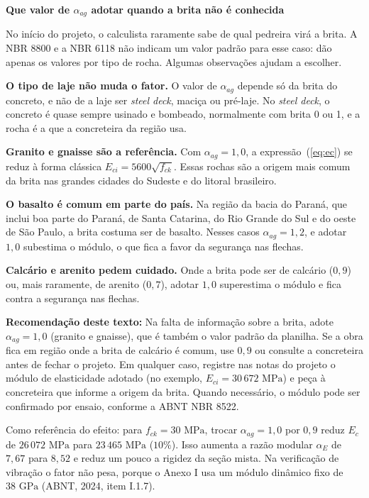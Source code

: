 \documentclass[11pt,a4paper]{article}
\newcommand{\caixaconceito}[2]{%
  \par\vspace{6pt}\noindent\colorbox{calloutbg}{%
    \parbox{\dimexpr\linewidth-2\fboxsep\relax}{%
      \vspace{4pt}\textbf{\color{primary}#1}\par\vspace{3pt}#2\vspace{4pt}%
    }%
  }\par\vspace{6pt}%
}
\begin{document}
\caixaconceito{Que valor de $\alpha_{ag}$ adotar quando a brita não é conhecida}{%
No início do projeto, o calculista raramente sabe de qual pedreira virá a brita. A NBR 8800 e a NBR 6118 não indicam um valor padrão para esse caso: dão apenas os valores por tipo de rocha. Algumas observações ajudam a escolher.\par\vspace{4pt}
\textbf{O tipo de laje não muda o fator.} O valor de $\alpha_{ag}$ depende só da brita do concreto, e não de a laje ser \textit{steel deck}, maciça ou pré-laje. No \textit{steel deck}, o concreto é quase sempre usinado e bombeado, normalmente com brita 0 ou 1, e a rocha é a que a concreteira da região usa.\par\vspace{4pt}
\textbf{Granito e gnaisse são a referência.} Com $\alpha_{ag} = 1{,}0$, a expressão~(\ref{eq:ec}) se reduz à forma clássica $E_{ci} = 5600\sqrt{f_{ck}}$. Essas rochas são a origem mais comum da brita nas grandes cidades do Sudeste e do litoral brasileiro.\par\vspace{4pt}
\textbf{O basalto é comum em parte do país.} Na região da bacia do Paraná, que inclui boa parte do Paraná, de Santa Catarina, do Rio Grande do Sul e do oeste de São Paulo, a brita costuma ser de basalto. Nesses casos $\alpha_{ag} = 1{,}2$, e adotar $1{,}0$ subestima o módulo, o que fica a favor da segurança nas flechas.\par\vspace{4pt}
\textbf{Calcário e arenito pedem cuidado.} Onde a brita pode ser de calcário ($0{,}9$) ou, mais raramente, de arenito ($0{,}7$), adotar $1{,}0$ superestima o módulo e fica contra a segurança nas flechas.\par\vspace{4pt}
\textbf{Recomendação deste texto:} Na falta de informação sobre a brita, adote $\alpha_{ag} = 1{,}0$ (granito e gnaisse), que é também o valor padrão da planilha. Se a obra fica em região onde a brita de calcário é comum, use $0{,}9$ ou consulte a concreteira antes de fechar o projeto. Em qualquer caso, registre nas notas do projeto o módulo de elasticidade adotado (no exemplo, $E_{ci} = 30\,672\text{ MPa}$) e peça à concreteira que informe a origem da brita. Quando necessário, o módulo pode ser confirmado por ensaio, conforme a ABNT NBR 8522.}

Como referência do efeito: para $f_{ck} = 30\text{ MPa}$, trocar $\alpha_{ag} = 1{,}0$ por $0{,}9$ reduz $E_c$ de $26\,072\text{ MPa}$ para $23\,465\text{ MPa}$ ($10\%$). Isso aumenta a razão modular $\alpha_E$ de $7{,}67$ para $8{,}52$ e reduz um pouco a rigidez da seção mista. Na verificação de vibração o fator não pesa, porque o Anexo I usa um módulo dinâmico fixo de $38\text{ GPa}$ (ABNT, 2024, item I.1.7).
\end{document}
